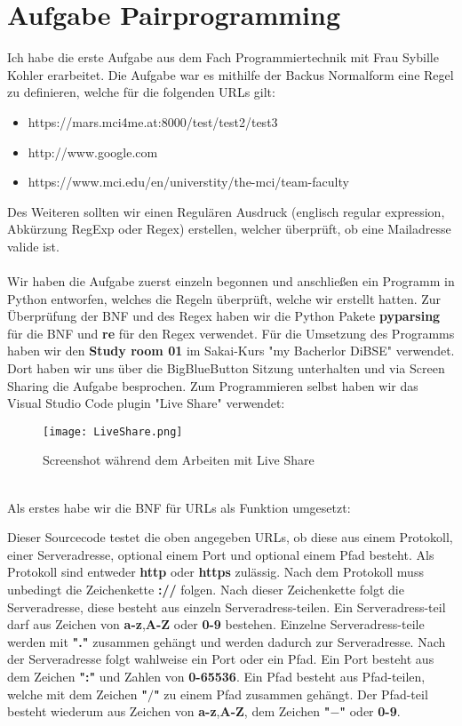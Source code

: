 \documentclass[12pt]{article}
\begin{document}
\section{Aufgabe Pairprogramming}
Ich habe die erste Aufgabe aus dem Fach Programmiertechnik mit Frau Sybille Kohler erarbeitet. Die Aufgabe war es mithilfe der Backus Normalform eine Regel zu definieren, welche für die folgenden URLs gilt:
\begin{itemize}
 \item https://mars.mci4me.at:8000/test/test2/test3
 \item http://www.google.com
 \item https://www.mci.edu/en/universtity/the-mci/team-faculty
\end{itemize}
Des Weiteren sollten wir einen Regulären Ausdruck (englisch regular expression, Abkürzung RegExp oder Regex) erstellen, welcher überprüft, ob eine Mailadresse valide ist.\\\\
Wir haben die Aufgabe zuerst einzeln begonnen und anschließen ein Programm in Python entworfen, welches die Regeln überprüft, welche wir erstellt hatten. Zur Überprüfung der BNF und des Regex haben wir die Python Pakete \textbf{pyparsing} für die BNF und \textbf{re} für den Regex verwendet. Für die Umsetzung des Programms haben wir den \textbf{Study room 01} im Sakai-Kurs "my Bacherlor DiBSE" verwendet. Dort haben wir uns über die BigBlueButton Sitzung unterhalten und via Screen Sharing die Aufgabe besprochen. Zum Programmieren selbst haben wir das Visual Studio Code plugin "Live Share" verwendet:
\begin{figure}[h]
 \begin{center}
  \texttt{[image: LiveShare.png]}
  \caption{Screenshot während dem Arbeiten mit Live Share}
 \end{center}
\end{figure}
\pagebreak\\
Als erstes habe wir die BNF für URLs als Funktion umgesetzt:

Dieser Sourcecode testet die oben angegeben URLs, ob diese aus einem Protokoll, einer Serveradresse, optional einem Port und optional einem Pfad besteht. Als Protokoll sind entweder \textbf{http} oder \textbf{https} zulässig. Nach dem Protokoll muss unbedingt die Zeichenkette \textbf{://} folgen. Nach dieser Zeichenkette folgt die Serveradresse, diese besteht aus einzeln Serveradress-teilen. Ein Serveradress-teil darf aus Zeichen von \textbf{a-z},\textbf{A-Z} oder \textbf{0-9} bestehen. Einzelne Serveradress-teile werden mit \textbf{"."} zusammen gehängt und werden dadurch zur Serveradresse. Nach der Serveradresse folgt wahlweise ein Port oder ein Pfad. Ein Port besteht aus dem Zeichen \textbf{":"} und Zahlen von \textbf{0-65536}. Ein Pfad besteht aus Pfad-teilen, welche mit dem Zeichen \textbf{"$/$"} zu einem Pfad zusammen gehängt. Der Pfad-teil besteht wiederum aus Zeichen von \textbf{a-z},\textbf{A-Z}, dem Zeichen \textbf{"$-$"} oder \textbf{0-9}.\\\\
\end{document}
